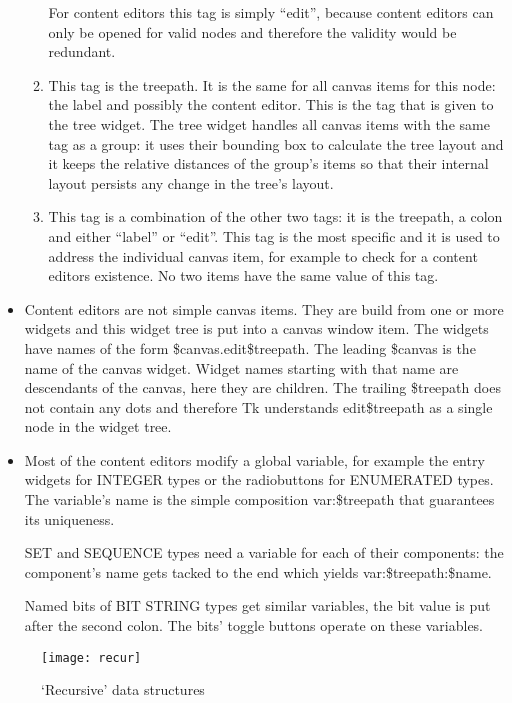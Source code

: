 \begin{itemize}
\begin{enumerate}
	For content editors this tag is simply ``edit'', because content editors can only be opened for valid nodes and therefore the validity would be redundant.
      \item
	This tag is the treepath.
	It is the same for all canvas items for this node: the label and possibly the content editor.
	This is the tag that is given to the tree widget.
	The tree widget handles all canvas items with the same tag as a group: it uses their bounding box to calculate the tree layout and it keeps the relative distances of the group's items so that their internal layout persists any change in the tree's layout.
      \item
	This tag is a combination of the other two tags: it is the treepath, a colon and either ``label'' or ``edit''.
	This tag is the most specific and it is used to address the individual canvas item, for example to check for a content editors existence.
	No two items have the same value of this tag.
    \end{enumerate}
  \item
    Content editors are not simple canvas items.
    They are build from one or more widgets and this widget tree is put into a canvas window item.
    The widgets have names of the form {\Tcl \$canvas.edit\$treepath}.
    The leading \$canvas is the name of the canvas widget.
    Widget names starting with that name are descendants of the canvas, here they are children.
    The trailing \$treepath does not contain any dots and therefore Tk understands edit\$treepath as a single node in the widget tree.
  \item
    Most of the content editors modify a global variable, for example the entry widgets for INTEGER types or the radiobuttons for ENUMERATED types.
    The variable's name is the simple composition {\Tcl var:\$treepath} that guarantees its uniqueness.

    SET and SEQUENCE types need a variable for each of their components: the component's name gets tacked to the end which yields {\Tcl var:\$treepath:\$name}.

    Named bits of BIT STRING types get similar variables, the bit value is put after the second colon.
    The bits' toggle buttons operate on these variables.
\end{itemize}

\begin{figure}
\begin{center}
\texttt{[image: recur]}
\caption{`Recursive' data structures}
\label{recursion}
\end{center}
\end{figure}


